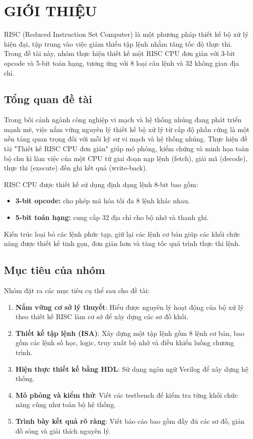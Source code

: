 

\section{GIỚI THIỆU}

RISC (Reduced Instruction Set Computer) là một phương pháp thiết kế bộ xử lý hiện đại, 
tập trung vào việc giảm thiểu tập lệnh nhằm tăng tốc độ thực thi. 
Trong đề tài này, nhóm thực hiện thiết kế một RISC CPU đơn giản với 3-bit opcode và 5-bit toán hạng, 
tương ứng với 8 loại câu lệnh và 32 không gian địa chỉ.

\subsection{Tổng quan đề tài}
Trong bối cảnh ngành công nghiệp vi mạch và hệ thống nhúng đang phát triển mạnh mẽ, 
việc nắm vững nguyên lý thiết kế bộ xử lý từ cấp độ phần cứng là một nền tảng quan trọng 
đối với mỗi kỹ sư vi mạch và hệ thống nhúng. 
Thực hiện đề tài "Thiết kế RISC CPU đơn giản" giúp mô phỏng, kiểm chứng và minh họa toàn bộ chu kì làm việc của một CPU từ giai đoạn nạp lệnh (fetch), giải mã (decode), 
thực thi (execute) đến ghi kết quả (write-back).

RISC CPU được thiết kế sử dụng định dạng lệnh 8-bit bao gồm:
\begin{itemize}
    \item \textbf{3-bit opcode:} cho phép mã hóa tối đa 8 lệnh khác nhau.
    \item \textbf{5-bit toán hạng:} cung cấp 32 địa chỉ cho bộ nhớ và thanh ghi.
\end{itemize}

Kiến trúc loại bỏ các lệnh phức tạp, giữ lại các lệnh cơ bản giúp các khối chức năng được thiết kế tinh gọn, đơn giản hơn và tăng tốc quá trình thực thi lệnh.
\subsection{Mục tiêu của nhóm}
Nhóm đặt ra các mục tiêu cụ thể sau cho đề tài:
\begin{enumerate}
    \item \textbf{Nắm vững cơ sở lý thuyết}: Hiểu được nguyên lý hoạt động của bộ xử lý theo thiết kế RISC 
    làm cơ sở để xây dựng các sơ đồ khối.
    \item \textbf{Thiết kế tập lệnh (ISA)}: Xây dựng một tập lệnh gồm 8 lệnh cơ bản, bao gồm các lệnh số học, logic, truy xuất bộ nhớ và điều khiển luồng chương trình.
    \item \textbf{Hiện thực thiết kế bằng HDL}: Sử dụng ngôn ngữ Verilog để xây dựng hệ thống.
    \item \textbf{Mô phỏng và kiểm thử}: Viết các testbench để kiểm tra từng khối chức năng cũng như toàn bộ hệ thống.
    \item \textbf{Trình bày kết quả rõ ràng}: Viết báo cáo bao gồm đầy đủ các sơ đồ, giản đồ sóng và giải thích nguyên lý.
\end{enumerate}

